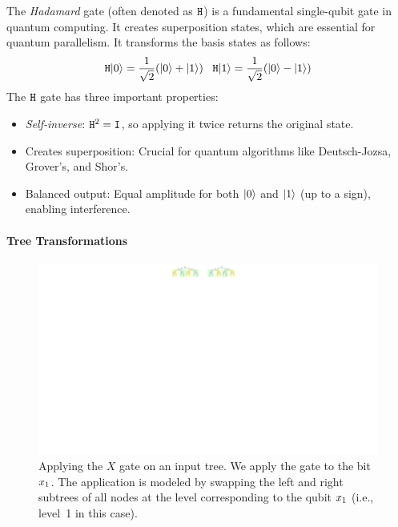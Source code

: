 The {\it Hadamard} gate (often denoted as $\mathtt{H}$) is a fundamental single-qubit gate in quantum computing. 
%
It creates superposition states, which are essential for quantum parallelism.
%
It transforms the basis states as follows:
\[
\mathtt{H}|0\rangle=\frac{1}{\sqrt2}(|0\rangle+|1\rangle)
\;\;\;
\mathtt{H}|1\rangle=\frac{1}{\sqrt2}(|0\rangle-|1\rangle)
\]
%
The $\mathtt{H}$ gate has three important properties:
\begin{itemize}
\item
{\it Self-inverse}: $\mathtt{H}^2 = \mathtt{I}$, so applying it twice returns the original state.
\item
Creates superposition: Crucial for quantum algorithms like Deutsch-Jozsa, Grover’s, and Shor’s.
\item
Balanced output: Equal amplitude for both $|0\rangle$ and $|1\rangle$  (up to a sign), enabling interference.
\end{itemize}

\paragraph{Tree Transformations}

\begin{figure}[ht] 
    \centering
    \includegraphics[scale=0.9]{Figures/Trees/ApplyNOT} 
    \caption{Applying the $X$ gate on an input tree. 
    We apply the gate to the bit $x_1$.
    The application is modeled by swapping the left and right subtrees of all nodes at the level corresponding to the qubit $x_1$ (i.e., level~1 in this case).}
    \label{apply:not:fig}
\end{figure}

